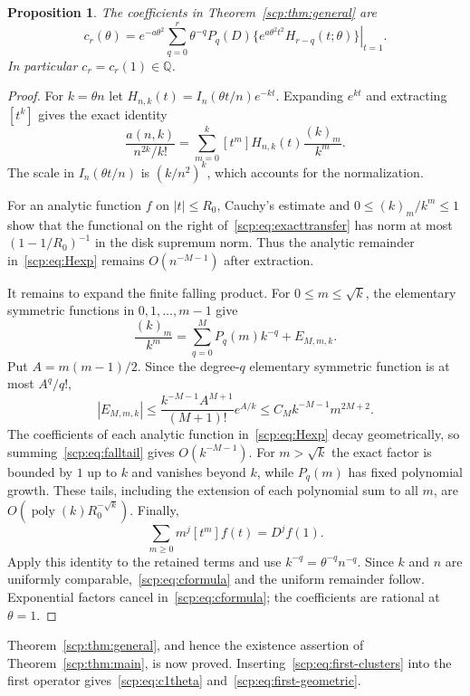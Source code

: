\documentclass[11pt]{article}
\newtheorem{proposition}{Proposition}
\newcommand{\fall}[2]{(#1)_{#2}}
\begin{document}
\begin{proposition}\label{scp:prop:algorithm}
The coefficients in Theorem~\ref{scp:thm:general} are
\begin{equation}\label{scp:eq:cformula}
 c_r(\theta)=e^{-a\theta^2}
 \sum_{q=0}^r\theta^{-q}
 \left. P_q(D)\{e^{a\theta^2t^2}H_{r-q}(t;\theta)\}\right|_{t=1}.
\end{equation}
In particular $c_r=c_r(1)\in\mathbb Q$.
\end{proposition}
\begin{proof}
For $k=\theta n$ let $H_{n,k}(t)=I_n(\theta t/n)e^{-kt}$. Expanding $e^{kt}$ and extracting $[t^k]$ gives the exact identity
\begin{equation}\label{scp:eq:exacttransfer}
 \frac{a(n,k)}{n^{2k}/k!}
 =\sum_{m=0}^k[t^m]H_{n,k}(t)\frac{\fall{k}{m}}{k^m}.
\end{equation}
The scale in $I_n(\theta t/n)$ is $(k/n^2)^k$, which accounts for the normalization.

For an analytic function $f$ on $|t|\le R_0$, Cauchy's estimate and $0\le\fall{k}{m}/k^m\le1$ show that the functional on the right of~\eqref{scp:eq:exacttransfer} has norm at most $(1-1/R_0)^{-1}$ in the disk supremum norm. Thus the analytic remainder in~\eqref{scp:eq:Hexp} remains $O(n^{-M-1})$ after extraction.

It remains to expand the finite falling product. For $0\le m\le\sqrt{k}$, the elementary symmetric functions in $0,1,\ldots,m-1$ give
\[
 \frac{\fall{k}{m}}{k^m}
 =\sum_{q=0}^M P_q(m)k^{-q}+E_{M,m,k}.
\]
Put $A=m(m-1)/2$. Since the degree-$q$ elementary symmetric function is at most $A^q/q!$,
\begin{equation}\label{scp:eq:falltail}
 |E_{M,m,k}|
 \le \frac{k^{-M-1}A^{M+1}}{(M+1)!}e^{A/k}
 \le C_M k^{-M-1}m^{2M+2}.
\end{equation}
The coefficients of each analytic function in~\eqref{scp:eq:Hexp} decay geometrically, so summing~\eqref{scp:eq:falltail} gives $O(k^{-M-1})$. For $m>\sqrt{k}$ the exact factor is bounded by $1$ up to $k$ and vanishes beyond $k$, while $P_q(m)$ has fixed polynomial growth. These tails, including the extension of each polynomial sum to all $m$, are $O(\operatorname{poly}(k)R_0^{-\sqrt{k}})$. Finally,
\[
 \sum_{m\ge0}m^j[t^m]f(t)=D^jf(1).
\]
Apply this identity to the retained terms and use $k^{-q}=\theta^{-q}n^{-q}$. Since $k$ and $n$ are uniformly comparable,~\eqref{scp:eq:cformula} and the uniform remainder follow. Exponential factors cancel in~\eqref{scp:eq:cformula}; the coefficients are rational at $\theta=1$.
\end{proof}
Theorem~\ref{scp:thm:general}, and hence the existence assertion of Theorem~\ref{scp:thm:main}, is now proved. Inserting~\eqref{scp:eq:first-clusters} into the first operator gives~\eqref{scp:eq:c1theta} and~\eqref{scp:eq:first-geometric}.
\end{document}
